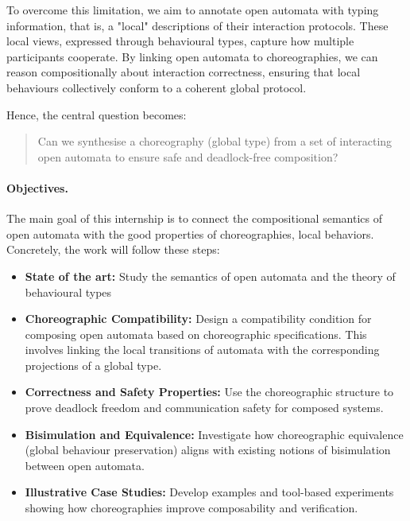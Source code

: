 \documentclass[11pt,a4paper]{article}
\begin{document}
To overcome this limitation, we aim to annotate open automata with typing  information, that is, a "local" descriptions of their interaction protocols. These local views, expressed through behavioural types, capture how multiple participants cooperate. By linking open automata to choreographies, we can reason compositionally about interaction correctness, ensuring that local behaviours collectively conform to a coherent global protocol.

Hence, the central question becomes:
\begin{quote}
Can we synthesise a choreography (global type) from a set of interacting open automata to ensure safe and deadlock-free composition?\end{quote}

\paragraph{Objectives.}

The main goal of this internship is to connect the compositional semantics of open automata with the good properties of choreographies, local behaviors. Concretely, the work will follow these steps:

\begin{itemize}
\item {\bf State of the art:} Study the semantics of open automata and the theory of behavioural types \cite{Gay_Vasconcelos_2025}
\item {\bf Choreographic Compatibility:}
Design a compatibility condition for composing open automata based on choreographic specifications. This involves linking the local transitions of automata with the corresponding projections of a global type.

\item {\bf Correctness and Safety Properties:}
Use the choreographic structure to prove deadlock freedom and communication safety for composed systems.

\item {\bf Bisimulation and Equivalence:}
Investigate how choreographic equivalence (global behaviour preservation) aligns with existing notions of bisimulation between open automata.

\item {\bf Illustrative Case Studies:}
Develop examples and tool-based experiments showing how choreographies improve composability and verification.

\end{itemize}
\end{document}
